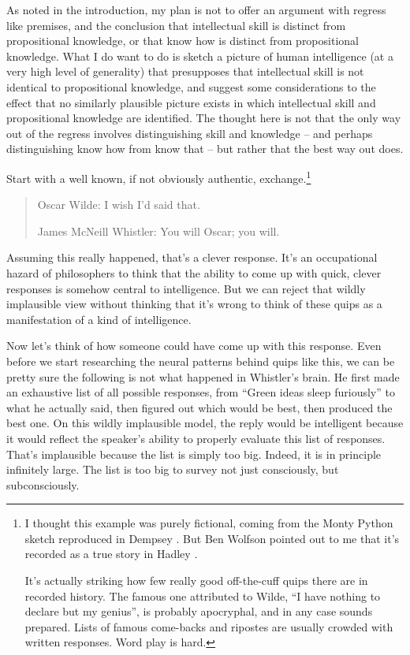 As noted in the introduction, my plan is not to offer an argument with regress like premises, and the conclusion that intellectual skill is distinct from propositional knowledge, or that know how is distinct from propositional knowledge. What I do want to do is sketch a picture of human intelligence (at a very high level of generality) that presupposes that intellectual skill is not identical to propositional knowledge, and suggest some considerations to the effect that no similarly plausible picture exists in which intellectual skill and propositional knowledge are identified. The thought here is not that the only way out of the regress involves distinguishing skill and knowledge -- and perhaps distinguishing know how from know that -- but rather that the best way out does.

Start with a well known, if not obviously authentic, exchange.\footnote{I thought this example was purely fictional, coming from the Monty Python sketch reproduced in Dempsey \citeyearpar[p. 741]{MontyPython}. But Ben Wolfson pointed out to me that it's recorded as a true story in Hadley \citeyearpar[p. 255]{Hadley1903}. 

It's actually striking how few really good off-the-cuff quips there are in recorded history. The famous one attributed to Wilde, ``I have nothing to declare but my genius'', is probably apocryphal, and in any case sounds prepared. Lists of famous come-backs and ripostes are usually crowded with written responses. Word play is hard.}

\begin{quote}
Oscar Wilde: I wish I'd said that.

James McNeill Whistler: You will Oscar; you will. 
\end{quote}
Assuming this really happened, that's a clever response. It's an occupational hazard of philosophers to think that the ability to come up with quick, clever responses is somehow central to intelligence. But we can reject that wildly implausible view without thinking that it's wrong to think of these quips as a manifestation of a kind of intelligence.

Now let's think of how someone could have come up with this response. Even before we start researching the neural patterns behind quips like this, we can be pretty sure the following is not what happened in Whistler's brain. He first made an exhaustive list of all possible responses, from ``Green ideas sleep furiously'' to what he actually said, then figured out which would be best, then produced the best one. On this wildly implausible model, the reply would be intelligent because it would reflect the speaker's ability to properly evaluate this list of responses. That's implausible because the list is simply too big. Indeed, it is in principle infinitely large. The list is too big to survey not just consciously, but subconsciously.

